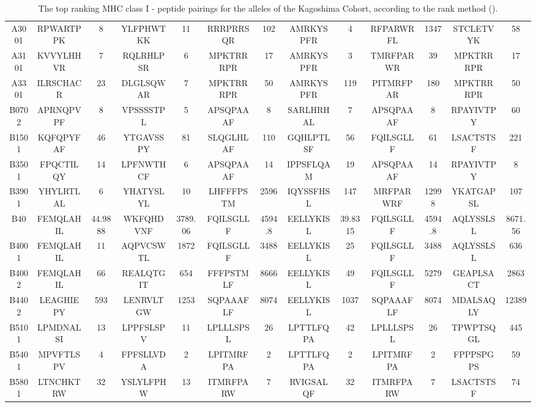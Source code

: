 \begin{table}[htp]
\begin{center}
\begin{sideways}
{\begin{tabulary}{1.5\textwidth}{|c|c|c|c|c|c|c|c|c|c|c|c|c|}
A3001 & RPWARTPPK & 8 & YLFPHWTKK & 11 & RRRPRRSQR & 102 & AMRKYSPFR & 4 & RFPARWRFL & 1347 & STCLETVYK & 58\\
A3101 & KVVYLHHVR & 7 & RQLRHLPSR & 6 & MPKTRRRPR & 17 & AMRKYSPFR & 3 & TMRFPARWR & 39 & MPKTRRRPR & 17\\
A3301 & ILRSCHACR & 23 & DLGLSQWAR & 7 & MPKTRRRPR & 50 & AMRKYSPFR & 119 & PITMRFPAR & 180 & MPKTRRRPR & 50\\
B0702 & APRNQPVPF & 8 & VPSSSSTPL & 5 & APSQPAAAF & 8 & SARLHRHAL & 7 & APSQPAAAF & 8 & RPAYIVTPY & 60\\
B1501 & KQFQPYFAF & 46 & YTGAVSSPY & 81 & SLQGLHLAF & 110 & GQHLPTLSF & 56 & FQILSGLLF & 61 & LSACTSTSF & 221\\
B3501 & FPQCTILQY & 14 & LPFNWTHCF & 6 & APSQPAAAF & 14 & IPPSFLQAM & 19 & APSQPAAAF & 14 & RPAYIVTPY & 8\\
B3901 & YHYLRTLAL & 6 & YHATYSLYL & 10 & LHFFFPSTM & 2596 & IQYSSFHSL & 147 & MRFPARWRF & 12998 & YKATGAPSL & 107\\
B40 & FEMQLAHIL & 44.9888 & WKFQHDVNF & 3789.06 & FQILSGLLF & 4594.8 & EELLYKISL & 39.8315 & FQILSGLLF & 4594.8 & AQLYSSLSL & 8671.56\\
B4001 & FEMQLAHIL & 11 & AQPVCSWTL & 1872 & FQILSGLLF & 3488 & EELLYKISL & 25 & FQILSGLLF & 3488 & AQLYSSLSL & 636\\
B4002 & FEMQLAHIL & 66 & REALQTGIT & 654 & FFFPSTMLF & 8666 & EELLYKISL & 49 & FQILSGLLF & 5279 & GEAPLSACT & 2863\\
B4402 & LEAGHIEPY & 593 & LENRVLTGW & 1253 & SQPAAAFLF & 8074 & EELLYKISL & 1037 & SQPAAAFLF & 8074 & MDALSAQLY & 12389\\
B5101 & LPMDNALSI & 13 & LPPFSLSPV & 11 & LPLLLSPSL & 26 & LPTTLFQPA & 42 & LPLLLSPSL & 26 & TPWPTSQGL & 445\\
B5401 & MPVFTLSPV & 4 & FPFSLLVDA & 2 & LPITMRFPA & 2 & LPTTLFQPA & 2 & LPITMRFPA & 2 & FPPPSPGPS & 59\\
B5801 & LTNCHKTRW & 32 & YSLYLFPHW & 13 & ITMRFPARW & 7 & RVIGSALQF & 32 & ITMRFPARW & 7 & LSACTSTSF & 74 \bigstrut[b] \\
\hline
\end{tabulary}
}
\end{sideways}
\end{center}
\caption[The top-ranking MHC class I - peptide binding affinities]{The top ranking MHC class I - peptide pairings for the alleles of the Kagoshima Cohort, according to the rank method ().}	
\label{appendixc/table7}
\end{table}


